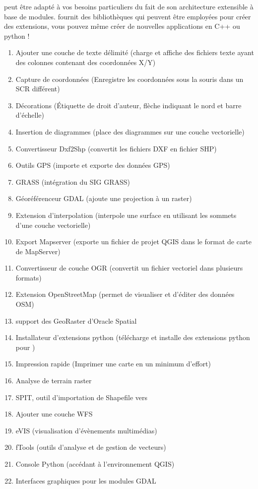 
\qg peut être adapté à vos besoins particuliers du fait de son architecture extensible à base de modules. \qg fournit des bibliothèques qui peuvent être employées pour créer des extensions, vous pouvez même créer de nouvelles applications en C++ ou python !


\begin{enumerate}
\item Ajouter une couche de texte délimité (charge et affiche des fichiers texte ayant des colonnes contenant des coordonnées X/Y)
\item Capture de coordonnées (Enregistre les coordonnées sous la souris dans un SCR différent)
\item Décorations (Étiquette de droit d'auteur, flèche indiquant le nord et barre d'échelle)
\item Insertion de diagrammes (place des diagrammes sur une couche vectorielle)
\item Convertisseur Dxf2Shp (convertit les fichiers DXF en fichier SHP)
\item Outils GPS (importe et exporte des données GPS)
\item GRASS (intégration du SIG GRASS)
\item Géoréférenceur GDAL (ajoute une projection à un raster)
\item Extension d'interpolation (interpole une surface en utilisant les sommets d'une couche vectorielle)
\item Export Mapserver (exporte un fichier de projet QGIS dans le format de carte de MapServer)
\item Convertisseur de couche OGR (convertit un fichier vectoriel dans plusieurs formats)
\item Extension OpenStreetMap (permet de visualiser et d'éditer des données OSM)
\item support des GeoRaster d'Oracle Spatial
\item Installateur d'extensions python (télécharge et installe des extensions python pour \qg)
\item Impression rapide (Imprimer une carte en un minimum d'effort)
\item Analyse de terrain raster
\item SPIT, outil d'importation de Shapefile vers \ppg
\item Ajouter une couche WFS 
\item eVIS (visualisation d'évènements multimédias)
\item fTools (outils d'analyse et de gestion de vecteurs)
\item Console Python (accédant à l'environnement QGIS)
\item Interfaces graphiques pour les modules GDAL
\end{enumerate}


